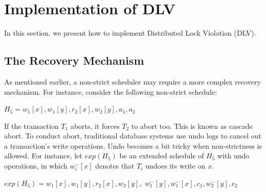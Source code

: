 \documentclass[conference]{IEEEtran}
\begin{document}

\section{Implementation of DLV}
\label{sec:implement}

In this section, we present how to implement Distributed Lock Violation (DLV).


\subsection {The Recovery Mechanism}

As mentioned earlier, a non-strict scheduler may require a more complex recovery mechanism.
For instance, consider the following non-strict schedule:

\begin{center}
${H_5 = w_1[x], w_1[y], r_2[x], w_2[y], a_1, a_2}$
\end{center}

If the transaction ${T_1}$ aborts, it forces ${T_2}$ to abort too.
This is known as cascade abort.
To conduct abort, traditional database systems use undo logs to cancel out a transaction's write operations.
Undo becomes a bit tricky when non-strictness is allowed.
For instance, let ${exp(H_5)}$ be an extended schedule of $H_5$ with undo operations,
in which ${w^-_i[x]}$ denotes that ${T_i}$ undoes its write on ${x}$.

\begin{center}
  ${exp(H_5) =  w_1[x], w_1[y], r_2[x], w_2[y]},$
  ${w^-_1[y], w^-_1[x], c_1, w^-_2[y], c_2}$
\end{center}
\end{document}
